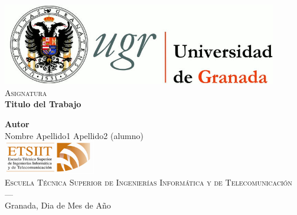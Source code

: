 \documentclass[a4paper,openright,12pt]{report}
\begin{document}
\begin{titlepage}
  
\newlength{\centeroffset}
\setlength{\centeroffset}{-0.5\oddsidemargin}
\addtolength{\centeroffset}{0.5\evensidemargin}
\thispagestyle{empty}
\noindent\hspace*{\centeroffset}

\begin{minipage}{\textwidth}

\centering

\includegraphics[width=0.9\textwidth]{Images/UGR.jpg}\\[1.5cm]

\textsc{\Large Asignatura\\[0.5cm]}
\Huge\bfseries Titulo del Trabajo\\

\end{minipage}

\vspace{2.5cm}
\noindent\hspace*{\centeroffset}\begin{minipage}{\textwidth}
\centering
\textbf{Autor}\\ {Nombre Apellido1 Apellido2 (alumno)}\\[3cm]

\includegraphics[width=0.3\textwidth]{Images/ETSIIT.png}\\[0.5cm]

\textsc{Escuela Técnica Superior de Ingenierías Informática y de Telecomunicación}\\
\textsc{---}\\Granada, Dia de Mes de Año

\end{minipage}

\end{titlepage}

\setcounter{page}{2}
\end{document}
